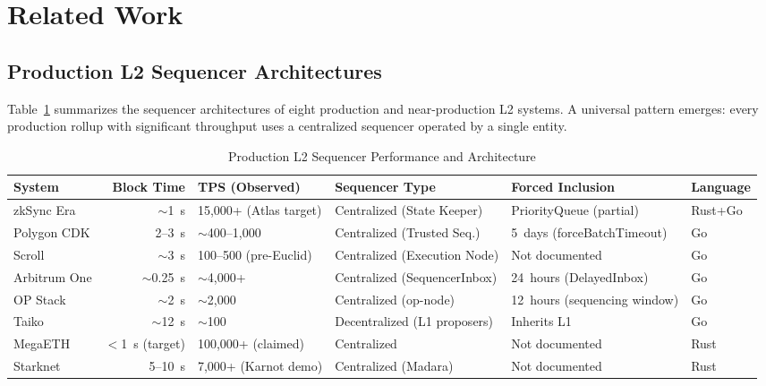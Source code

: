 
\section{Related Work}

\subsection{Production L2 Sequencer Architectures}

Table~\ref{tab:sequencer-comparison} summarizes the sequencer architectures of eight
production and near-production L2 systems. A universal pattern emerges: every production
rollup with significant throughput uses a centralized sequencer operated by a single
entity.

\begin{table}[htbp]
\caption{Production L2 Sequencer Performance and Architecture}
\label{tab:sequencer-comparison}
\centering
\begin{tabular}{lrllll}
\toprule
\textbf{System} & \textbf{Block Time} & \textbf{TPS (Observed)} & \textbf{Sequencer Type} & \textbf{Forced Inclusion} & \textbf{Language} \\
\midrule
zkSync Era & ${\sim}$1~s & 15{,}000+ (Atlas target) & Centralized (State Keeper) & PriorityQueue (partial) & Rust+Go \\
Polygon CDK & 2--3~s & ${\sim}$400--1{,}000 & Centralized (Trusted Seq.) & 5~days (forceBatchTimeout) & Go \\
Scroll & ${\sim}$3~s & 100--500 (pre-Euclid) & Centralized (Execution Node) & Not documented & Go \\
Arbitrum One & ${\sim}$0.25~s & ${\sim}$4{,}000+ & Centralized (SequencerInbox) & 24~hours (DelayedInbox) & Go \\
OP Stack & ${\sim}$2~s & ${\sim}$2{,}000 & Centralized (op-node) & 12~hours (sequencing window) & Go \\
Taiko & ${\sim}$12~s & ${\sim}$100 & Decentralized (L1 proposers) & Inherits L1 & Go \\
MegaETH & $<$1~s (target) & 100{,}000+ (claimed) & Centralized & Not documented & Rust \\
Starknet & 5--10~s & 7{,}000+ (Karnot demo) & Centralized (Madara) & Not documented & Rust \\
\bottomrule
\end{tabular}
\end{table}

